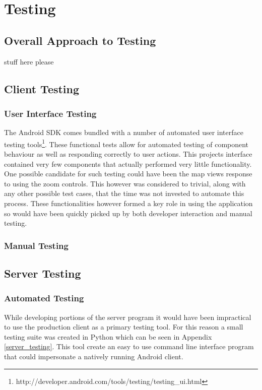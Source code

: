 \chapter{Testing}
\section{Overall Approach to Testing}
stuff here please

\section{Client Testing}
\subsection{User Interface Testing}
The Android SDK comes bundled with a number of automated user interface testing tools\footnote{http://developer.android.com/tools/testing/testing\_ui.html}. These functional tests allow for automated testing of component behaviour as well as responding correctly to user actions. This projects interface contained very few components that actually performed very little functionality. One possible candidate for such testing could have been the map views response to using the zoom controls. This however was considered to trivial, along with any other possible test cases, that the time was not invested to automate this process. These functionalities however formed a key role in using the application so would have been quickly picked up by both developer interaction and manual testing.

\subsection{Manual Testing}


\section{Server Testing}
\subsection{Automated Testing}
While developing portions of the server program it would have been impractical to use the production client as a primary testing tool. For this reason a small testing suite was created in Python which can be seen in Appendix \ref{server_testing}. This tool create an easy to use command line interface program that could impersonate a natively running Android client.

